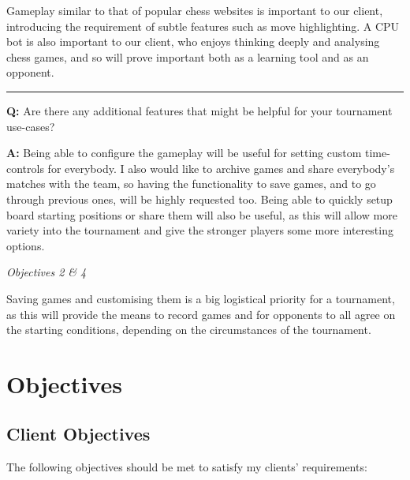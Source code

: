 \documentclass[../main/main.tex]{subfiles}
\begin{document}
\noindent Gameplay similar to that of popular chess websites is important to our client, introducing the requirement of subtle features such as move highlighting. A CPU bot is also important to our client, who enjoys thinking deeply and analysing chess games, and so will prove important both as a learning tool and as an opponent.

\noindent\rule{\textwidth}{0.4pt}

\noindent\textbf{Q:} Are there any additional features that might be helpful for your tournament use-cases?

\noindent\textbf{A:} Being able to configure the gameplay will be useful for setting custom time-controls for everybody. I also would like to archive games and share everybody’s matches with the team, so having the functionality to save games, and to go through previous ones, will be highly requested too. Being able to quickly setup board starting positions or share them will also be useful, as this will allow more variety into the tournament and give the stronger players some more interesting options.

\bigskip

\noindent\textit{Objectives 2 \& 4}

\noindent Saving games and customising them is a big logistical priority for a tournament, as this will provide the means to record games and for opponents to all agree on the starting conditions, depending on the circumstances of the tournament.

\section{Objectives}
\subsection{Client Objectives}
The following objectives should be met to satisfy my clients’ requirements:

\newcommand\objitem{\item\label{obj:\theenumi\theenumii}}
\end{document}
